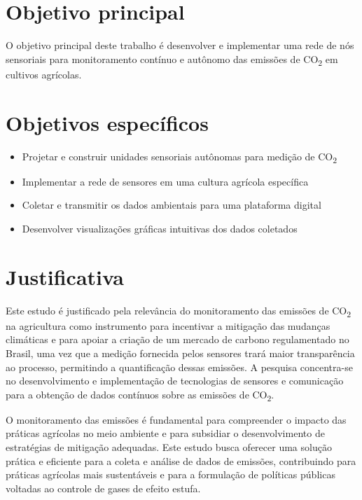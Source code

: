 \section{Objetivo principal}
O objetivo principal deste trabalho é desenvolver e implementar uma rede de nós sensoriais para monitoramento contínuo e autônomo das emissões de CO\textsubscript{2} em cultivos agrícolas.

\section{Objetivos específicos}
\begin{itemize}
    \item Projetar e construir unidades sensoriais autônomas para medição de CO\textsubscript{2}
    \item Implementar a rede de sensores em uma cultura agrícola específica
    \item Coletar e transmitir os dados ambientais para uma plataforma digital
    \item Desenvolver visualizações gráficas intuitivas dos dados coletados
\end{itemize}

\section{Justificativa}

Este estudo é justificado pela relevância do monitoramento das emissões de CO\textsubscript{2} na agricultura como instrumento para incentivar a mitigação das mudanças climáticas e para apoiar a criação de um mercado de carbono regulamentado no Brasil, uma vez que a medição fornecida pelos sensores trará maior transparência ao processo, permitindo a quantificação dessas emissões. A pesquisa concentra-se no desenvolvimento e implementação de tecnologias de sensores e comunicação para a obtenção de dados contínuos sobre as emissões de CO\textsubscript{2}.

O monitoramento das emissões é fundamental para compreender o impacto das práticas agrícolas no meio ambiente e para subsidiar o desenvolvimento de estratégias de mitigação adequadas. Este estudo busca oferecer uma solução prática e eficiente para a coleta e análise de dados de emissões, contribuindo para práticas agrícolas mais sustentáveis e para a formulação de políticas públicas voltadas ao controle de gases de efeito estufa.